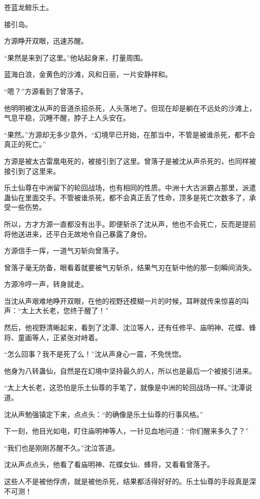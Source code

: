 \begin{this_body}
苍蓝龙鲸乐土。

接引岛。

方源睁开双眼，迅速苏醒。

“果然是来到了这里。”他站起身来，打量周围。

蓝海白浪，金黄色的沙滩，风和日丽，一片安静祥和。

“嗯？”方源看到了曾落子。

他明明被沈从声的音道杀招杀死，人头落地了。但现在却是躺在不远处的沙滩上，气息平稳，沉睡不醒，脖子上人头安在。

“果然。”方源却无多少意外，“幻境早已开始，在那当中，不管是被谁杀死，都不会真正的死亡。”

方源是被太古雷凰电死的，被接引到了这里。曾落子是被沈从声杀死的，也同样被接引到了这里来。

乐土仙尊在中洲留下的轮回战场，也有相同的性质。中洲十大古派霸占那里，派遣蛊仙在里面交手。不管被谁杀死，都不会真正丢了性命，顶多是死亡次数多了，承受一些伤势。

所以，方才方源一直都没有出手。即便斩杀了沈从声，他也不会死亡，反而是提前将他送进来，还平白无故地令自己暴露了身份。

方源信手一挥，一道气刃斩向曾落子。

曾落子毫无防备，眼看着就要被气刃斩杀，结果气刃在斩中他的那一刻瞬间消失。

方源冷哼一声，转身就走。

当沈从声艰难地睁开双眼，在他的视野还模糊一片的时候，耳畔就传来惊喜的叫声：“太上大长老，您终于醒了！”

然后，他视野清晰起来，看到了沈潭、沈泣等人，还有任修平、庙明神、花蝶、蜂将、童画等人，正紧张对峙着。

“怎么回事？我不是死了么！”沈从声身心一震，不免恍惚。

他身为八转蛊仙，自然是在幻境中坚持最久的人，所以也是最后一个被接引进来。

“太上大长老，这恐怕是乐土仙尊的手笔了，就像是中洲的轮回战场一样。”沈潭说道。

沈从声勉强镇定下来，点点头：“的确像是乐土仙尊的行事风格。”

下一刻，他目光如电，盯住庙明神等人，一针见血地问道：“你们醒来多久了？”

“我们也是刚刚苏醒不久。”沈泣答道。

沈从声点点头，他看了看庙明神、花蝶女仙、蜂将，又看看曾落子。

这些人不是被他俘虏，就是被他杀死，结果都活得好好的。乐土仙尊的手段真是深不可测！

\end{this_body}

